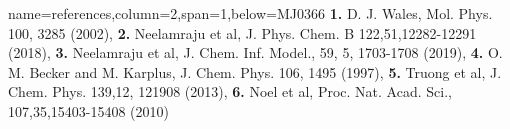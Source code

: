 \documentclass[a0paper,portrait]{baposter}
\begin{document}
\begin{poster}
{name=references,column=2,span=1,below=MJ0366}{
\small
\renewcommand*{\bibfont}{\footnotesize}
\renewcommand*{\bibfont}{\footnotesize}
\bibfont{\textbf{1.} D. J. Wales, Mol. Phys. 100, 3285 (2002),} 
\bibfont{\textbf{2.} Neelamraju et al, J. Phys. Chem. B 122,51,12282-12291 (2018),} 
\bibfont{\textbf{3.} Neelamraju et al, J. Chem. Inf.  Model., 59, 5, 1703-1708 (2019),}
\bibfont{\textbf{4.} O. M. Becker and M. Karplus, J. Chem. Phys. 106, 1495 (1997),}
\bibfont{\textbf{5.} Truong et al, J. Chem. Phys. 139,12, 121908 (2013), \textbf{6.} Noel et al, Proc. Nat. Acad. Sci., 107,35,15403-15408 (2010)}
}
% 
% 



\end{poster}
\end{document}
